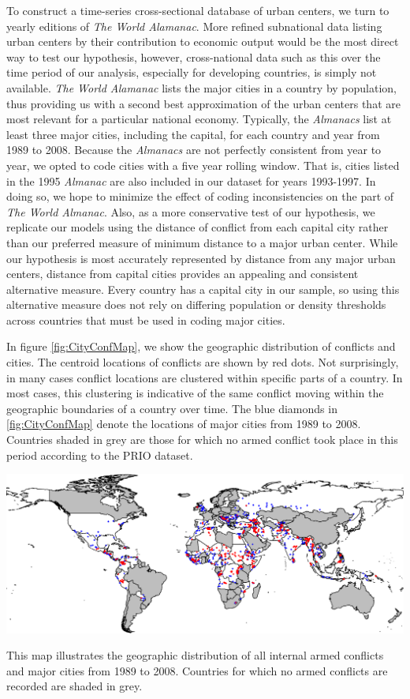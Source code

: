 To construct a time-series cross-sectional database of urban centers, we turn to yearly editions of \emph{The World Alamanac}. More refined subnational data listing urban centers by their contribution to economic output would be the most direct way to test our hypothesis, however, cross-national data such as this over the time period of our analysis, especially for developing countries, is simply not available. \emph{The World Alamanac} lists the major cities in a country by population, thus providing us with a second best approximation of the urban centers that are most relevant for a particular national economy. Typically, the \emph{Almanacs} list at least three major cities, including the capital, for each country and year from 1989 to 2008. Because the \emph{Almanacs} are not perfectly consistent from year to year, we opted to code cities with a five year rolling window. That is, cities listed in the 1995 \emph{Almanac} are also included in our dataset for years 1993-1997. In doing so, we hope to minimize the effect of coding inconsistencies on the part of \emph{The World Almanac}. Also, as a more conservative test of our hypothesis, we replicate our models using the distance of conflict from each capital city rather than our preferred measure of minimum distance to a major urban center. While our hypothesis is most accurately represented by distance from any major urban centers, distance from capital cities provides an appealing and consistent alternative measure. Every country has a capital city in our sample, so using this alternative measure does not rely on differing population or density thresholds across countries that must be used in coding major cities.

In figure \ref{fig:CityConfMap}, we show the geographic distribution of conflicts and cities. The centroid locations of conflicts are shown by red dots. Not surprisingly, in many cases conflict locations are clustered within specific parts of a country. In most cases, this clustering is indicative of the same conflict moving within the geographic boundaries of a country over time. The blue diamonds in \ref{fig:CityConfMap} denote the locations of major cities from 1989 to 2008. Countries shaded in grey are those for which no armed conflict took place in this period according to the PRIO dataset.  

\begin{amssidewaysfigure}
	\centering
	\includegraphics[width=1\textwidth]{CityConfMap-crop}
	\caption{This map illustrates the geographic distribution of all internal armed conflicts and major cities from 1989 to 2008. Countries for which no armed conflicts are recorded are shaded in grey.}
	\label{fig:CityConfMap}
\end{amssidewaysfigure}
\FloatBarrier

